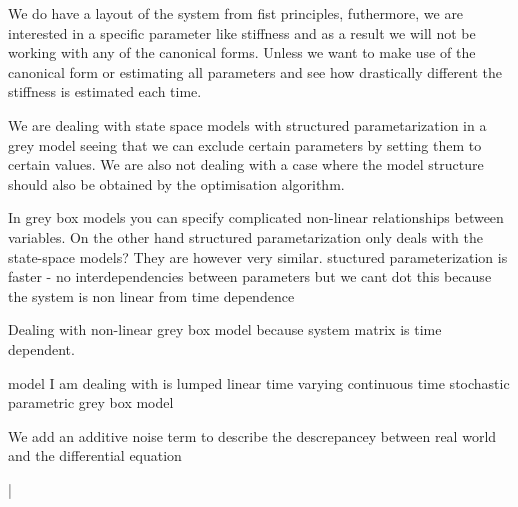 We do have a layout of the system from fist principles, futhermore, we are interested in a specific parameter like stiffness and as a result we will not be working with any of the canonical forms. Unless we want to make use of the canonical form or estimating all parameters and see how drastically different the stiffness is estimated each time.

We are dealing with state space models with structured parametarization in a grey model seeing that we can exclude certain parameters by setting them to certain values. We are also not dealing with a case where the model structure should also be obtained by the optimisation algorithm.

In grey box models you can specify complicated non-linear relationships between variables. On the other hand structured parametarization only deals with the state-space models? They are however very similar. stuctured parameterization is faster - no interdependencies between parameters but we cant dot this because the system is non linear from time dependence

Dealing with non-linear grey box model because system matrix is time dependent.

model I am dealing with is lumped linear time varying continuous time stochastic parametric grey box model


We add an additive noise term to describe the descrepancey between real world and the differential equation





|